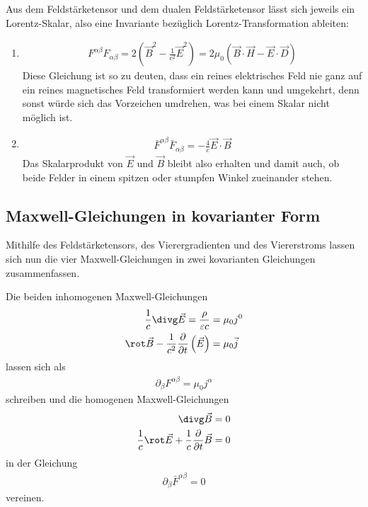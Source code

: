 Aus dem Feldstärketensor und dem dualen Feldstärketensor lässt sich jeweils ein Lorentz-Skalar, also eine Invariante bezüglich Lorentz-Transformation ableiten:
\begin{enumerate}
    \item \begin{align*}
              F^{\alpha\beta}F_{\alpha\beta}=2\left(\vec B^2-\frac{1}{c^2}\vec E^2\right) = 2\mu_0(\vec B\cdot\vec H-\vec E\cdot\vec D)
          \end{align*}
          Diese Gleichung ist so zu deuten, dass ein reines elektrisches Feld nie ganz auf ein reines magnetisches Feld transformiert werden kann und umgekehrt, denn sonst würde sich das Vorzeichen umdrehen, was bei einem Skalar nicht möglich ist.
    \item \begin{align*}
              \bar F^{\alpha\beta}\bar F_{\alpha\beta}=-\frac{4}{c}\vec E\cdot \vec B
          \end{align*}
          Das Skalarprodukt von $\vec E$ und $\vec B$ bleibt also erhalten und damit auch, ob beide Felder in einem spitzen oder stumpfen Winkel zueinander stehen.
\end{enumerate}



\subsection{Maxwell-Gleichungen in kovarianter Form}

Mithilfe des Feldstärketensors, des Vierergradienten und des Viererstroms lassen sich nun die vier Maxwell-Gleichungen in zwei kovarianten Gleichungen zusammenfassen.

Die beiden inhomogenen Maxwell-Gleichungen
\begin{align*}
    \frac{1}{c}\divg \vec E = \frac{\rho}{\varepsilon c}                      & =\mu_0 j^0     \\
    \rot \vec B - \frac{1}{c^2}\frac{\partial}{\partial t}\left(\vec E\right) & = \mu_0 \vec j
\end{align*}
lassen sich als
\begin{align}
    \boxed{\partial_\beta F^{\alpha\beta}=\mu_0 j^\alpha}
\end{align}
schreiben und die homogenen Maxwell-Gleichungen
\begin{align*}
    \divg \vec B                                                          & =0 \\
    \frac{1}{c}\rot\vec E + \frac{1}{c} \frac{\partial}{\partial t}\vec B & =0
\end{align*}
in der Gleichung
\begin{align}
    \boxed{\partial_\beta\bar F^{\alpha\beta} = 0}
\end{align}
vereinen.

